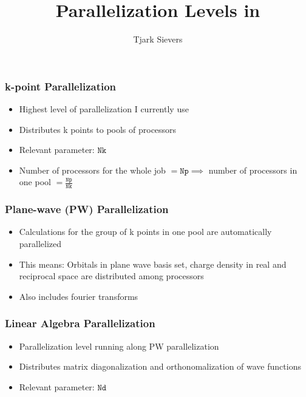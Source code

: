 \documentclass[aspectratio=169]{beamer}
\title[Parallelization Levels in \QE]{Parallelization Levels in \QE}
\author{Tjark Sievers}
\date{}
\institute[I. ITP -- AG ESoCM]{I. Institute of Theoretical Physics}
\begin{document}
{
\begin{frame}
	\titlepage
\end{frame}
}
\addtocounter{framenumber}{-1}

\begin{frame}
	\frametitle{k-point Parallelization}

	\begin{itemize}
		\item Highest level of parallelization I currently use
		\item Distributes k points to pools of processors
		\item Relevant parameter: \(\mathtt{Nk}\)
		\item Number of processors for the whole job \( = \mathtt{Np} \implies\) number of processors in one pool \(= \frac{\mathtt{Np}}{\mathtt{Nk}}\)
	\end{itemize}
\end{frame}

\begin{frame}
	\frametitle{Plane-wave (PW) Parallelization}

	\begin{itemize}
		\item Calculations for the group of k points in one pool are automatically parallelized
		\item This means: Orbitals in plane wave basis set, charge density in real and reciprocal
		space are distributed among processors
		\item Also includes fourier transforms
	\end{itemize}
\end{frame}

\begin{frame}
	\frametitle{Linear Algebra Parallelization}

	\begin{itemize}
		\item Parallelization level running along PW parallelization
		\item Distributes matrix diagonalization and orthonomalization of wave functions
		\item Relevant parameter: \(\mathtt{Nd}\)
	\end{itemize}

\end{frame}
\end{document}
